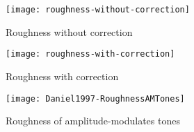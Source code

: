 \documentclass[a4paper]{article}
\begin{document}
\begin{figure}[ht]
    \centering
    \begin{minipage}[b]{0.45\linewidth}
        \centering
        \texttt{[image: roughness-without-correction]}
        \caption{Roughness without correction}
\label{fig:rwoc}
    \end{minipage}
    \quad
    \begin{minipage}[b]{0.45\linewidth}
        \centering
        \texttt{[image: roughness-with-correction]}
        \caption{Roughness with correction}
\label{fig:rwc}
    \end{minipage}
\end{figure}

\begin{figure}[ht]
    \centering
    \texttt{[image: Daniel1997-RoughnessAMTones]}
    \caption{Roughness of amplitude-modulates tones
\cite[pp.~118]{daniel1997psychoacoustical}}
\label{fig:rorigfig}
\end{figure}

\custombibliography{}
\end{document}
